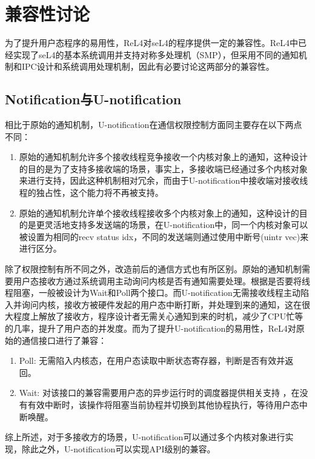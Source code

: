 \section{兼容性讨论}
\label{sec:rel4_comp}
为了提升用户态程序的易用性，ReL4对seL4的程序提供一定的兼容性。ReL4中已经实现了seL4的基本系统调用并支持对称多处理机（SMP），但采用不同的通知机制和IPC设计和系统调用处理机制，因此有必要讨论这两部分的兼容性。

\subsection{Notification与U-notification}

相比于原始的通知机制，U-notification在通信权限控制方面同主要存在以下两点不同：

\begin{enumerate}
  \item 原始的通知机制允许多个接收线程竞争接收一个内核对象上的通知，这种设计的目的是为了支持多接收端的场景，事实上，多接收端已经通过多个内核对象来进行支持，因此这种机制相对冗余，而由于U-notification中接收端对接收线程的独占性，这个能力将不再被支持。
  \item 原始的通知机制允许单个接收线程接收多个内核对象上的通知，这种设计的目的是更灵活地支持多发送端的场景，在U-notification中，同一个内核对象可以被设置为相同的recv status idx，不同的发送端则通过使用中断号(uintr vec)来进行区分。
\end{enumerate}

除了权限控制有所不同之外，改造前后的通信方式也有所区别。原始的通知机制需要用户态接收方通过系统调用主动询问内核是否有通知需要处理。根据是否要将线程阻塞，一般被设计为Wait和Poll两个接口。而U-notification无需接收线程主动陷入并询问内核，接收方被硬件发起的用户态中断打断，并处理到来的通知，这在很大程度上解放了接收方，程序设计者无需关心通知到来的时机，减少了CPU忙等的几率，提升了用户态的并发度。而为了提升U-notification的易用性，ReL4对原始的通信接口进行了兼容：
\begin{enumerate}
  \item Poll: 无需陷入内核态，在用户态读取中断状态寄存器，判断是否有效并返回。
  \item Wait: 对该接口的兼容需要用户态的异步运行时的调度器提供相关支持	，在没有有效中断时，该操作将阻塞当前协程并切换到其他协程执行，等待用户态中断唤醒。
\end{enumerate}

综上所述，对于多接收方的场景，U-notification可以通过多个内核对象进行实现，除此之外，U-notification可以实现API级别的兼容。

